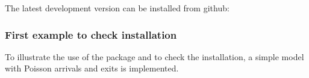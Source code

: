 The latest development version can be installed from github:

\begin{Shaded}
\begin{Highlighting}[]
\SpecialCharTok{::}\NormalTok{(}\NormalTok{)}
\end{Highlighting}
\end{Shaded}

\hypertarget{first-example-to-check-installation}{%
\subsubsection{First example to check installation}\label{first-example-to-check-installation}}

To illustrate the use of the package and to check the installation, a simple model with Poisson arrivals and exits is implemented.

\begin{Shaded}
\begin{Highlighting}[]

\OtherTok{\textless{}{-}} 
\OtherTok{\textless{}{-}} \NormalTok{(} \NormalTok{(} \NormalTok{)}

\OtherTok{=} \NormalTok{(} \NormalTok{, } \NormalTok{)}
\OtherTok{=} \NormalTok{(} \NormalTok{, } \NormalTok{)}
\OtherTok{=} \NormalTok{(} \OtherTok{=} \NormalTok{, } \OtherTok{=} \NormalTok{)}

\OtherTok{\textless{}{-}} \NormalTok{(} 
\end{Highlighting}
\end{Shaded}

